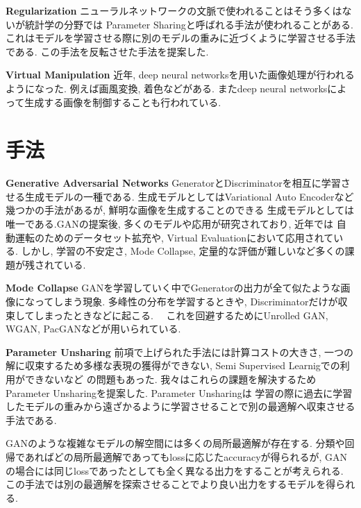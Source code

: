 \documentclass[techrep, submit, noauthor,preface]{ipsj}
\begin{document}
{\bf Regularization} ニューラルネットワークの文脈で使われることはそう多くはないが統計学の分野では
Parameter Sharing\cite{deeplearningbook}と呼ばれる手法が使われることがある.
これはモデルを学習させる際に別のモデルの重みに近づくように学習させる手法である.
この手法を反転させた手法を提案した.

{\bf Virtual Manipulation} 近年, deep neural networksを用いた画像処理が行われるようになった.
例えば画風変換\cite{style}, 着色\cite{inpaint}などがある. またdeep neural networksによって生成する画像を制御することも行われている\cite{pix2pixhd}.

\section{手法}

{\bf Generative Adversarial Networks} GeneratorとDiscriminatorを相互に学習させる生成モデルの一種である.
生成モデルとしてはVariational Auto Encoderなど幾つかの手法があるが, 鮮明な画像を生成することのできる
生成モデルとしては唯一である.GANの提案後, 多くのモデルや応用が研究されており, 近年では
自動運転のためのデータセット拡充や, Virtual Evaluationにおいて応用されている.
しかし, 学習の不安定さ, Mode Collapse, 定量的な評価が難しいなど多くの課題が残されている.

{\bf Mode Collapse} GANを学習していく中でGeneratorの出力が全て似たような画像になってしまう現象. 多峰性の分布を学習するときや,
Discriminatorだけが収束してしまったときなどに起こる.　
これを回避するためにUnrolled GAN\cite{unrolled}, WGAN\cite{wgan}, PacGAN\cite{pacgan}などが用いられている.

{\bf Parameter Unsharing} 前項で上げられた手法には計算コストの大きさ, 一つの解に収束するため多様な表現の獲得ができない, Semi Supervised Learnigでの利用ができないなど
の問題もあった. 我々はこれらの課題を解決するためParameter Unsharingを提案した.
Parameter Unsharingは
学習の際に過去に学習したモデルの重みから遠ざかるように学習させることで別の最適解へ収束させる手法である.

GANのような複雑なモデルの解空間には多くの局所最適解が存在する.
分類や回帰であればどの局所最適解であってもlossに応じたaccuracyが得られるが, 
GANの場合には同じlossであったとしても全く異なる出力をすることが考えられる.
この手法では別の最適解を探索させることでより良い出力をするモデルを得られる.
\end{document}
